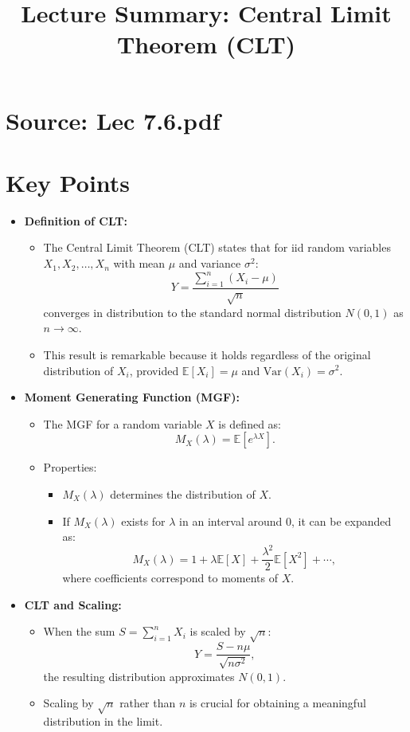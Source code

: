 \documentclass{article}
\title{Lecture Summary: Central Limit Theorem (CLT)}
\author{}
\date{}
\begin{document}
\maketitle

\section*{Source: Lec 7.6.pdf}

\section*{Key Points}

\begin{itemize}
  \item \textbf{Definition of CLT:}
    \begin{itemize}
      \item The Central Limit Theorem (CLT) states that for iid random variables $X_1, X_2, \dots, X_n$ with mean $\mu$ and variance $\sigma^2$:
        \[
          Y = \frac{\sum_{i=1}^n (X_i - \mu)}{\sqrt{n}}
        \]
        converges in distribution to the standard normal distribution $N(0, 1)$ as $n \to \infty$.
      \item This result is remarkable because it holds regardless of the original distribution of $X_i$, provided $\mathbb{E}[X_i] = \mu$ and $\text{Var}(X_i) = \sigma^2$.
    \end{itemize}

  \item \textbf{Moment Generating Function (MGF):}
    \begin{itemize}
      \item The MGF for a random variable $X$ is defined as:
        \[
          M_X(\lambda) = \mathbb{E}[e^{\lambda X}].
        \]
      \item Properties:
        \begin{itemize}
          \item $M_X(\lambda)$ determines the distribution of $X$.
          \item If $M_X(\lambda)$ exists for $\lambda$ in an interval around $0$, it can be expanded as:
            \[
              M_X(\lambda) = 1 + \lambda \mathbb{E}[X] + \frac{\lambda^2}{2} \mathbb{E}[X^2] + \cdots,
            \]
            where coefficients correspond to moments of $X$.
        \end{itemize}
    \end{itemize}

  \item \textbf{CLT and Scaling:}
    \begin{itemize}
      \item When the sum $S = \sum_{i=1}^n X_i$ is scaled by $\sqrt{n}$:
        \[
          Y = \frac{S - n\mu}{\sqrt{n\sigma^2}},
        \]
        the resulting distribution approximates $N(0, 1)$.
      \item Scaling by $\sqrt{n}$ rather than $n$ is crucial for obtaining a meaningful distribution in the limit.
    \end{itemize}


\end{itemize}
\end{document}
